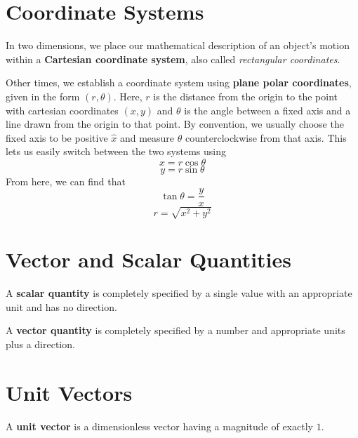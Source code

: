 \section*{Coordinate Systems}

In two dimensions, we place our mathematical description of an object's motion
within a \textbf{Cartesian coordinate system}, also
called \emph{rectangular coordinates}.

Other times, we establish a coordinate system using \textbf{plane polar
coordinates}, given in
the form $(r,\theta)$. Here, $r$ is the distance from the origin to the point
with cartesian coordinates $(x, y)$ and $\theta$ is the angle between a fixed
axis and a line drawn from the origin to that point. By convention, we usually
choose the fixed axis to be positive $\hat x$ and measure $\theta$ counterclockwise
from that axis. This lets us easily switch between the two systems using
\begin{equation}
  \label{eq:xcos}
  x = r \cos \theta
\end{equation}
\begin{equation}
  \label{eq:ysin}
  y = r \sin \theta
\end{equation}
From here, we can find that
\begin{equation}
  \label{eq:tantheta}
  \tan \theta = \frac{y}{x}
\end{equation}
\begin{equation}
  \label{eq:rpyth}
  r = \sqrt{x^2 + y^2}
\end{equation}

\section*{Vector and Scalar Quantities}

A \textbf{scalar quantity} is completely specified by a single value with an
appropriate unit and has no direction.

A \textbf{vector quantity} is completely specified by a number and appropriate
units plus a direction.

\section*{Unit Vectors}

A \textbf{unit vector} is a dimensionless vector having a
magnitude of exactly $1$.


%



